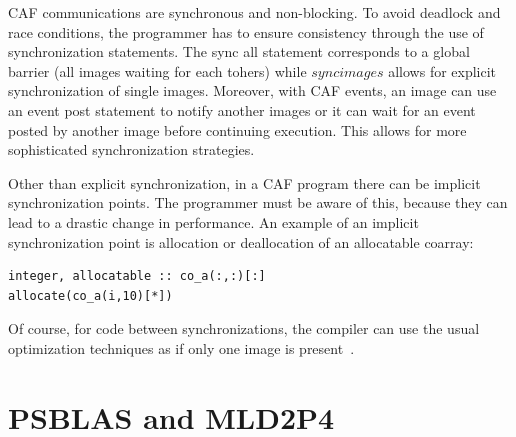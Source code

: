 \documentclass{IOS-Book-Article}
\begin{document}
CAF communications are synchronous and non-blocking. 
To avoid deadlock and race conditions, the programmer has to ensure consistency through the use of synchronization statements.
The sync all statement corresponds to a global barrier (all images waiting for each tohers) while $sync images$ allows for explicit synchronization of single images. Moreover, with CAF events, an image can use an event post statement to notify another images or it can wait for an event posted by another image before continuing execution. This allows for more sophisticated synchronization strategies.  

Other than explicit synchronization, in a CAF program there can be implicit synchronization points. The programmer must be aware of this, because they can lead to a drastic change in performance.
An example of an implicit synchronization point is allocation or deallocation of an allocatable coarray:

\begin{lstlisting}
integer, allocatable :: co_a(:,:)[:]
allocate(co_a(i,10)[*])
\end{lstlisting}

Of course, for code between synchronizations, the compiler can use the usual optimization techniques as if only one image is present~\cite{CAF}.

\section{PSBLAS and MLD2P4}
\end{document}
